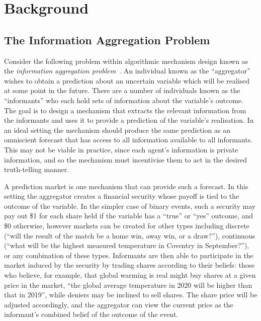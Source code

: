 \section{Background}

\label{sec:background}

\subsection{The Information Aggregation Problem}

Consider the following problem within algorithmic mechanism design known as the
\emph{information aggregation problem}~\cite[Ch.~26]{AGTBook}. An individual
known as the ``aggregator'' wishes to obtain a prediction about an uncertain
variable which will be realised at some point in the future. There are a number
of individuals known as the ``informants'' who each hold sets of information
about the variable's outcome. The goal is to design a mechanism that extracts
the relevant information from the informants and uses it to provide a
prediction of the variable's realisation. In an ideal setting the mechanism
should produce the same prediction as an omniscient forecast that has access to
all information available to all informants. This may not be viable in
practice, since each agent's information is private information, and so the
mechanism must incentivise them to act in the desired truth-telling manner.

A prediction market is one mechanism that can provide such a forecast. In this
setting the aggregator creates a financial security whose payoff is tied to the
outcome of the variable. In the simpler case of binary events, such a security
may pay out \$1 for each share held if the variable has a ``true'' or ``yes''
outcome, and \$0 otherwise, however markets can be created for other types
including discrete (``will the result of the match be a home win, away win, or
a draw?''), continuous (``what will be the highest measured temperature in
Coventry in September?''), or any combination of these types. Informants are
then able to participate in the market induced by the security by trading
shares according to their beliefs: those who believe, for example, that global
warming is real might buy shares at a given price in the market, ``the global
average temperature in 2020 will be higher than that in 2019'', while deniers
may be inclined to sell shares. The share price will be adjusted accordingly,
and the aggregator can view the current price as the informant's combined
belief of the outcome of the event.

